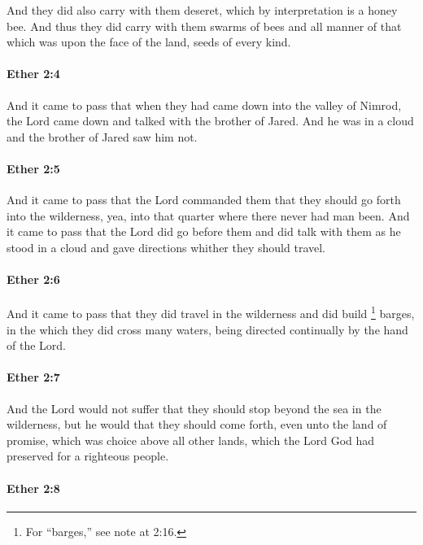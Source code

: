 			And they did also carry with them deseret,
			which by interpretation is a honey bee.
			And thus they did carry with them swarms of bees
			and all manner of that which was upon the face of the land,
			seeds of every kind.

		\paragraph{Ether 2:4} %
			\label{ETHER-2-4}

			And it came to pass that when they had came down into the valley of Nimrod,
			the Lord came down and talked with the brother of Jared.
			And he was in a cloud and the brother of Jared saw him not.

		\paragraph{Ether 2:5} %
			\label{ETHER-2-5}

			And it came to pass that the Lord commanded them
			that they should go forth into the wilderness,
			yea, into that quarter where there never had man been.
			And it came to pass that the Lord did go before them
			and did talk with them as he stood in a cloud
			and gave directions whither they should travel.

		\paragraph{Ether 2:6} %
			\label{ETHER-2-6}

			And it came to pass that they did travel in the wilderness
			and did build
			\footnote{%
				For ``barges,'' see note at 2:16.
				}%
			barges, in the which they did cross many waters,
			being directed continually by the hand of the Lord.

		\paragraph{Ether 2:7} %
			\label{ETHER-2-7}

			And the Lord would not suffer
			that they should stop beyond the sea in the wilderness,
			but he would that they should come forth, even unto the land of promise,
			which was choice above all other lands,
			which the Lord God had preserved for a righteous people.

		\paragraph{Ether 2:8} %
			\label{ETHER-2-8}

